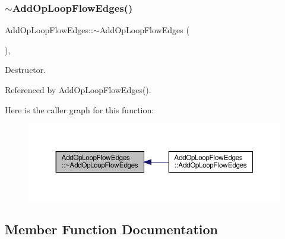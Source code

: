 \subsubsection{\texorpdfstring{$\sim$\+Add\+Op\+Loop\+Flow\+Edges()}{~AddOpLoopFlowEdges()}}
{\footnotesize\ttfamily Add\+Op\+Loop\+Flow\+Edges\+::$\sim$\+Add\+Op\+Loop\+Flow\+Edges (\begin{DoxyParamCaption}{ }\end{DoxyParamCaption})\hspace{0.3cm}{\ttfamily [override]}, {\ttfamily [default]}}



Destructor. 



Referenced by Add\+Op\+Loop\+Flow\+Edges().

Here is the caller graph for this function\+:
\nopagebreak
\begin{figure}[H]
\begin{center}
\leavevmode
\includegraphics[width=350pt]{da/d87/classAddOpLoopFlowEdges_a921a77265076b99c802a2b0b0655067b_icgraph}
\end{center}
\end{figure}


\subsection{Member Function Documentation}
\mbox{\label{classAddOpLoopFlowEdges_a56d18f3ddd600d866b6b79fdb3673adf}} 
